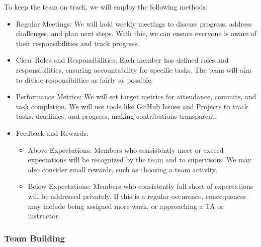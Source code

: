 \documentclass{article}
\begin{document}


To keep the team on track, we will employ the following methods:
\begin{itemize}
  \item Regular Meetings: We will hold weekly meetings to discuss progress, address challenges, and plan next steps. With this, we can ensure everyone is aware of their responsibilities and track progress.
  \item Clear Roles and Responsibilities: Each member has defined roles and responsibilities, ensuring accountability for specific tasks. The team will aim to divide responsibilties as fairly as possible. 
  \item Performance Metrics: We will set target metrics for attendance, commits, and task completion. We will use tools like GitHub Issues and Projects to track tasks, deadlines, and progress, making contributions transparent.
  \item Feedback and Rewards:
  \begin{itemize}
    \item Above Expectations: Members who consistently meet or exceed expectations will be recognized by the team and to supervisors. We may also consider small rewards, such as choosing a team activity.
    \item Below Expectations: Members who consistently fall short of expectations will be addressed privately. If this is a regular occurence, concequences may include being assigned more work, or approaching a TA or instructor.
  \end{itemize}
\end{itemize}

\subsubsection*{Team Building}
\end{document}
